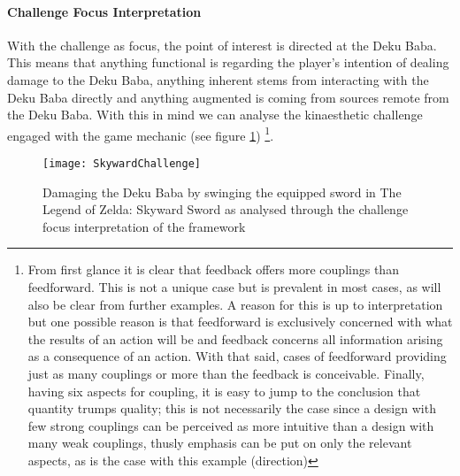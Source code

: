 \paragraph{Challenge Focus Interpretation}
With the challenge as focus, the point of interest is directed at the Deku Baba. This means that anything functional is regarding the player's intention of dealing damage to the Deku Baba, anything inherent stems from interacting with the Deku Baba directly and anything augmented is coming from sources remote from the Deku Baba. With this in mind we can analyse the kinaesthetic challenge engaged with the game mechanic (see figure \ref{SkywardChallenge}) \footnote{From first glance it is clear that feedback offers more couplings than feedforward. This is not a unique case but is prevalent in most cases, as will also be clear from further examples. A reason for this is up to interpretation but one possible reason is that feedforward is exclusively concerned with what the results of an action will be and feedback concerns all information arising as a consequence of an action. With that said, cases of feedforward providing just as many couplings or more than the feedback is conceivable. Finally, having six aspects for coupling, it is easy to jump to the conclusion that quantity trumps quality; this is not necessarily the case since a design with few strong couplings can be perceived as more intuitive than a design with many weak couplings, thusly emphasis can be put on only the relevant aspects, as is the case with this example (direction)}.

\begin{figure}[h]
  \texttt{[image: SkywardChallenge]}
  \caption{Damaging the Deku Baba by swinging the equipped sword in The Legend of Zelda: Skyward Sword as analysed through the challenge focus interpretation of the framework}
  \label{SkywardChallenge}
\end{figure}

